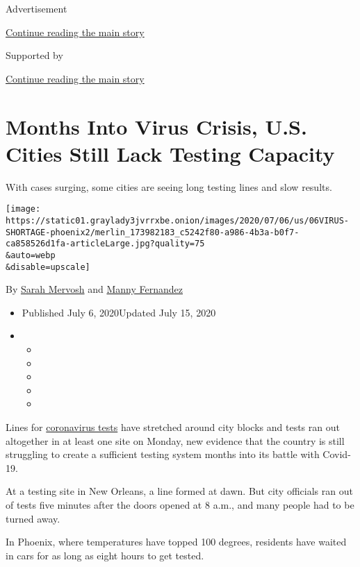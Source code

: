 Advertisement

\protect\hyperlink{after-top}{Continue reading the main story}

Supported by

\protect\hyperlink{after-sponsor}{Continue reading the main story}

\hypertarget{months-into-virus-crisis-us-cities-still-lack-testing-capacity}{%
\section{Months Into Virus Crisis, U.S. Cities Still Lack Testing
Capacity}\label{months-into-virus-crisis-us-cities-still-lack-testing-capacity}}

With cases surging, some cities are seeing long testing lines and slow
results.

\texttt{[image: https://static01.graylady3jvrrxbe.onion/images/2020/07/06/us/06VIRUS-SHORTAGE-phoenix2/merlin\_173982183\_c5242f80-a986-4b3a-b0f7-ca858526d1fa-articleLarge.jpg?quality=75\\\&auto=webp\\\&disable=upscale]}

By \href{https://www.nytimes3xbfgragh.onion/by/sarah-mervosh}{Sarah
Mervosh} and
\href{https://www.nytimes3xbfgragh.onion/by/manny-fernandez}{Manny
Fernandez}

\begin{itemize}
\item
  Published July 6, 2020Updated July 15, 2020
\item
  \begin{itemize}
  \item
  \item
  \item
  \item
  \item
  \end{itemize}
\end{itemize}

Lines for
\href{https://www.nytimes3xbfgragh.onion/2020/07/15/parenting/kids-covid-19-test.html}{coronavirus
tests} have stretched around city blocks and tests ran out altogether in
at least one site on Monday, new evidence that the country is still
struggling to create a sufficient testing system months into its battle
with Covid-19.

At a testing site in New Orleans, a line formed at dawn. But city
officials ran out of tests five minutes after the doors opened at 8
a.m., and many people had to be turned away.

In Phoenix, where temperatures have topped 100 degrees, residents have
waited in cars for as long as eight hours to get tested.

